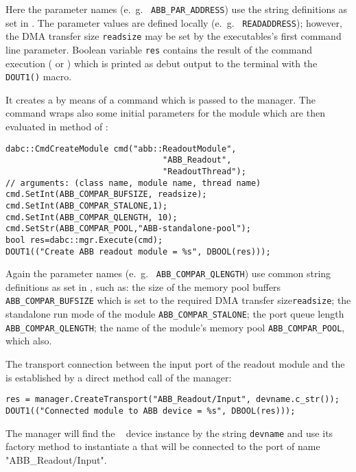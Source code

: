 \begin{compactenum}
Here the parameter names (e.~g.~ {\tt ABB\_PAR\_ADDRESS}) use
the string definitions as set in . The
parameter values are defined locally (e.~g.~ {\tt READADDRESS});
however, the DMA transfer size {\tt readsize} may be set by
the executables's first command line parameter. 
Boolean variable {\tt res} contains the result 
of the command execution ( or ) which is
printed as debut output to the terminal with the {\tt DOUT1()} macro. 

\item It creates a  by means of a command
 which is passed to the manager. The 
command wraps also some initial
parameters for the module which are then evaluated in 
method  of :

\begin{small}
\begin{verbatim}
dabc::CmdCreateModule cmd("abb::ReadoutModule",
                                "ABB_Readout", 
                                "ReadoutThread");
// arguments: (class name, module name, thread name)
cmd.SetInt(ABB_COMPAR_BUFSIZE, readsize);
cmd.SetInt(ABB_COMPAR_STALONE,1);
cmd.SetInt(ABB_COMPAR_QLENGTH, 10);
cmd.SetStr(ABB_COMPAR_POOL,"ABB-standalone-pool");
bool res=dabc::mgr.Execute(cmd);
DOUT1(("Create ABB readout module = %s", DBOOL(res)));
\end{verbatim}
\end{small}

Again the parameter names (e.~g.~ {\tt ABB\_COMPAR\_QLENGTH}) use
common string definitions as set in , 
such as: 
the size of the memory pool buffers {\tt ABB\_COMPAR\_BUFSIZE} which is
set to the required DMA transfer size{\tt readsize};
the standalone run mode of the module {\tt ABB\_COMPAR\_STALONE};
the port queue length {\tt ABB\_COMPAR\_QLENGTH}; the name of
the module's memory pool {\tt ABB\_COMPAR\_POOL}, which also. 

\item The transport connection between the input port of the readout module and
the  is established by a direct method call of the manager:
\begin{small}
\begin{verbatim}
res = manager.CreateTransport("ABB_Readout/Input", devname.c_str());
DOUT1(("Connected module to ABB device = %s", DBOOL(res)));
\end{verbatim}  
\end{small}
The manager will find the \ABB~ device instance by the string {\tt devname}
and use its factory method  to instantiate a
 that will be connected to the port of name
"ABB\_Readout/Input".


\end{compactenum}
